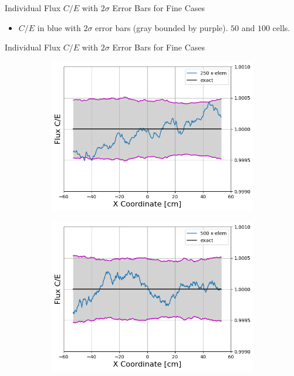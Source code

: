 \documentclass[9pt,t]{beamer}
\begin{document}
\begin{frame}{Individual Flux $C/E$ with $2\sigma$ Error Bars for Fine Cases}
\begin{figure}[T]
\begin{subfigure}{0.495\textwidth}
        \end{subfigure}
    \end{figure}
    \begin{itemize}
        \item $C/E$ in blue with $2\sigma$ error bars (gray bounded by purple). $50$ and $100$ cells.
    \end{itemize}
\end{frame}

\begin{frame}{Individual Flux $C/E$ with $2\sigma$ Error Bars for Fine Cases}
    \begin{figure}[T]
        \hspace*{-1.1cm}
        \begin{subfigure}{0.495\textwidth}
            \includegraphics[width=1.18\linewidth]{figures/250_flux_CE_error_bars}
        \end{subfigure}\hspace*{0.89cm}
        \begin{subfigure}{0.495\textwidth}
            \includegraphics[width=1.18\linewidth]{figures/500_flux_CE_error_bars}

\end{subfigure}
\end{figure}
\end{frame}
\end{document}
